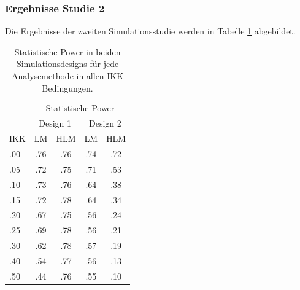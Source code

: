\documentclass[12pt]{article}\usepackage[]{graphicx}\usepackage[]{color}
\begin{document}
\subsubsection{Ergebnisse Studie 2}
Die Ergebnisse der zweiten Simulationsstudie werden in Tabelle \ref{tab:power_study2} abgebildet. 
\begin{table}[t!]
\centering
\setlength{\tabcolsep}{10pt}
\begin{threeparttable}
\caption{Statistische Power in beiden Simulationsdesigns für jede Analysemethode in allen IKK Bedingungen.}
\begin{tabular}{lcccc}
\toprule
	& \multicolumn{4}{c}{Statistische Power}\\
\cmidrule(lr){2-5}
	& \multicolumn{2}{c}{Design 1} & \multicolumn{2}{c}{Design 2} \\
\cmidrule(lr){2-3} \cmidrule(lr){4-5}
IKK & LM 	& HLM 	& LM 	& HLM \\ 
\midrule
.00 & .76 	& .76 	& .74 	& .72 \\ 
.05 & .72 	& .75 	& .71 	& .53 \\ 
.10 & .73 	& .76 	& .64 	& .38 \\ 
.15 & .72 	& .78 	& .64 	& .34 \\ 
.20 & .67 	& .75 	& .56 	& .24 \\ 
.25 & .69 	& .78 	& .56 	& .21 \\ 
.30 & .62 	& .78 	& .57 	& .19 \\ 
.40 & .54 	& .77 	& .56 	& .13 \\ 
.50 & .44 	& .76 	& .55 	& .10 \\ 
\bottomrule
\end{tabular}
\label{tab:power_study2}
\end{threeparttable}
\end{table}
\end{document}
